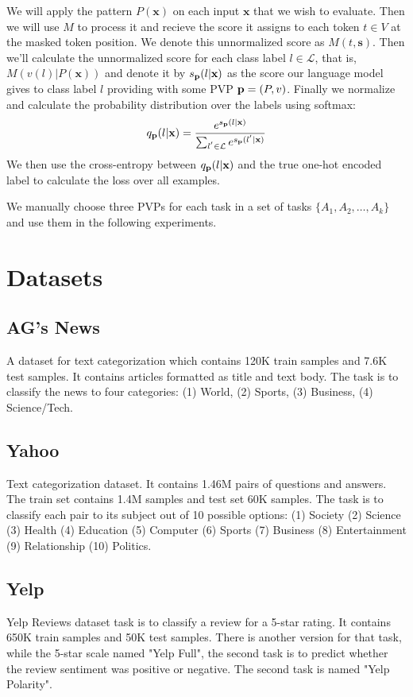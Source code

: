 \documentclass[11pt,a4paper]{article}
\begin{document}
We will apply the pattern $P(\textbf{x})$ on each input $\textbf{x}$ that we wish to evaluate.
Then we will use $M$ to process it and recieve the score it assigns to each token $t\in{}V$ at the masked token position.
We denote this unnormalized score as $M(t, \textbf{s})$.
Then we'll calculate the unnormalized score for each class label $l\in{}\mathcal{L}$, that is, $M(v(l) | P(\textbf{x}))$ and denote it by $s_{\text{\textbf{p}}}(l|\textbf{x})$ as the score our language model gives to class label $l$ providing with some PVP $\text{\textbf{p}}=(P, v)$.
Finally we normalize and calculate the probability distribution over the labels using softmax:
\[
	q_\text{\textbf{p}}(l|\textbf{x}) = \frac{e^{s_{\text{\textbf{p}}}(l|\textbf{x})}}{\sum_{l^{'}\in{}\mathcal{L}}e^{s_{\text{\textbf{p}}}(l^{'}|\textbf{x})}}
\]
We then use the cross-entropy between $q_\text{\textbf{p}}(l|\textbf{x})$ and the true one-hot encoded label to calculate the loss over all examples. 

We manually choose three PVPs for each task in a set of tasks $\{A_1, A_2, \dots, A_k\}$ and use them in the following experiments.


\section{Datasets}

\subsection{AG's News}
A dataset for text categorization which contains 120K train samples and 7.6K test samples.
It contains articles formatted as title and text body.
The task is to classify the news to four categories: (1) World, (2) Sports, (3) Business, (4) Science/Tech.

\subsection{Yahoo}
Text categorization dataset. It contains 1.46M pairs of questions and answers.
The train set contains 1.4M samples and test set 60K samples.
The task is to classify each pair to its subject out of 10 possible options: (1) Society (2) Science (3) Health (4) Education (5) Computer (6) Sports (7) Business (8) Entertainment (9) Relationship (10) Politics.

\subsection{Yelp}
Yelp Reviews dataset task is to classify a review for a 5-star rating.
It contains 650K train samples and 50K test samples.
There is another version for that task, while the 5-star scale named "Yelp Full", the second task is to predict whether the review sentiment was positive or negative.
The second task is named "Yelp Polarity".
\end{document}
